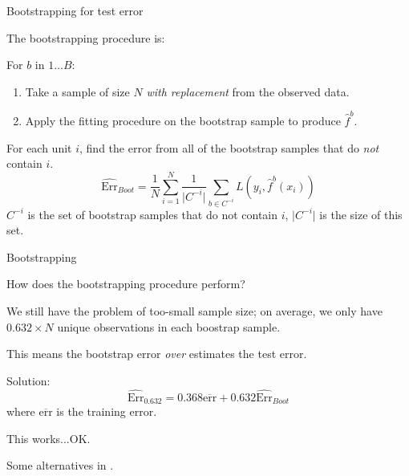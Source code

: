 \documentclass[xcolor={table}, handout]{beamer}
\begin{document}
\begin{frame}{Bootstrapping for test error}


The bootstrapping procedure is:

\begin{wideitemize}
\item For $b$ in $1\dots B$:\pause
\begin{enumerate}

    \item Take a sample of size $N$  \textit{with replacement} from the observed data.\pause

    \item Apply the fitting procedure on the bootstrap sample to produce $\hat f^b$.
    \end{enumerate}
\pause
\item For each unit $i$, find the error from all of the bootstrap samples that do \textit{not} contain $i$.\pause
\[
\widehat{\textrm{Err}}_{Boot} = \frac{1}{N}\sum_{i = 1}^N \frac{1}{\lvert C^{-i} \rvert}\sum_{b \in C^{-i}} L(y_i, \hat f^b (x_i))
\]
$C^{-i}$ is the set of bootstrap samples that do not contain $i$, $\lvert C^{-i} \rvert$ is the size of this set.
\end{wideitemize}

\end{frame}





\begin{frame}{Bootstrapping}

\begin{wideitemize}
\item How does the bootstrapping procedure perform?\pause
\item We still have the problem of too-small sample size\pause; on average, we only have $0.632 \times N$ unique observations in each boostrap sample. \pause
\item This means the bootstrap error \textit{over} estimates the test error. 
\item Solution: 
\[
\widehat{\textrm{Err}}_{0.632} = 0.368 \overline{\textrm{err}} + 0.632 \widehat{\textrm{Err}}_{Boot}  
\]
where $\overline{\textrm{err}}$ is the training error. \pause
\item This works...OK. \pause
\item Some alternatives in \cite{hastie2009elements}. 
\end{wideitemize}

\end{frame}
\end{document}
